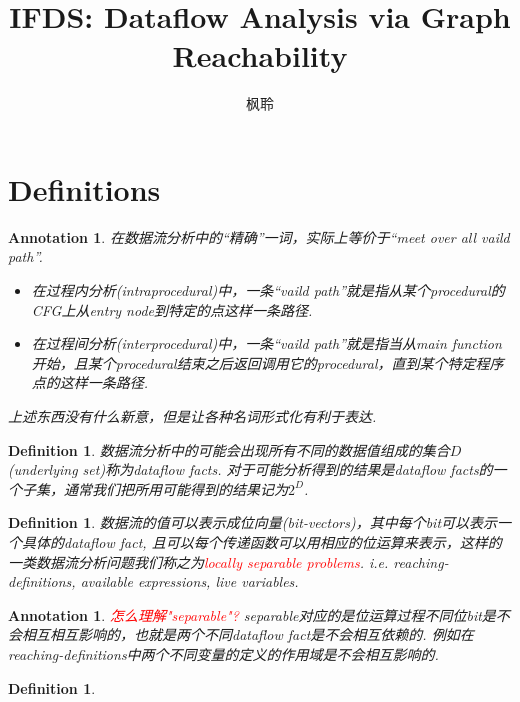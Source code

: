 \documentclass{article}
\newtheorem{definition}[theorem]{Definition}
\newtheorem{annotation}[theorem]{Annotation}
\newcommand{\redt}[1]{\textcolor{red}{#1}}
\begin{document}
\title{IFDS: Dataflow Analysis via Graph Reachability}
\author{枫聆}
\maketitle
\tableofcontents

\newpage
\section{Definitions}


\begin{annotation}
\rm 在数据流分析中的“精确”一词，实际上等价于“meet over all vaild path”. 
\begin{itemize}
	\item 在过程内分析(intraprocedural)中，一条“vaild path”就是指从某个procedural的CFG上从entry node到特定的点这样一条路径. 
	\item 在过程间分析(interprocedural)中，一条“vaild path”就是指当从main function开始，且某个procedural结束之后返回调用它的procedural，直到某个特定程序点的这样一条路径.  
\end{itemize}
上述东西没有什么新意，但是让各种名词形式化有利于表达. 
\end{annotation}

\begin{definition}
\rm 数据流分析中的可能会出现所有不同的数据值组成的集合$D$(underlying set)称为dataflow facts. 对于可能分析得到的结果是dataflow facts的一个子集，通常我们把所用可能得到的结果记为$2^D$. 
\end{definition}

\begin{definition}
\rm 数据流的值可以表示成位向量(bit-vectors)，其中每个bit可以表示一个具体的dataflow fact, 且可以每个传递函数可以用相应的位运算来表示，这样的一类数据流分析问题我们称之为\redt{locally separable problems}. i.e. reaching-definitions, available expressions, live variables. 
\end{definition}

\begin{annotation}
\rm \redt{怎么理解"separable"?} separable对应的是位运算过程不同位bit是不会相互相互影响的，也就是两个不同dataflow fact是不会相互依赖的. 例如在reaching-definitions中两个不同变量的定义的作用域是不会相互影响的.   
\end{annotation}

\begin{definition}
\rm 
\end{definition}
\end{document}
